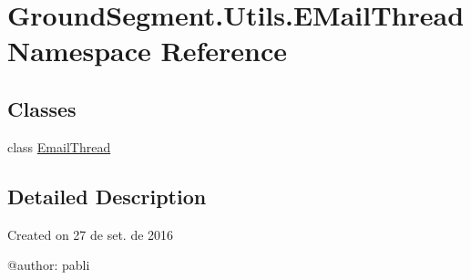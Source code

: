 \hypertarget{namespace_ground_segment_1_1_utils_1_1_e_mail_thread}{}\section{Ground\+Segment.\+Utils.\+E\+Mail\+Thread Namespace Reference}
\label{namespace_ground_segment_1_1_utils_1_1_e_mail_thread}
\subsection*{Classes}
\begin{DoxyCompactItemize}
\item 
class \hyperlink{class_ground_segment_1_1_utils_1_1_e_mail_thread_1_1_email_thread}{Email\+Thread}
\end{DoxyCompactItemize}


\subsection{Detailed Description}
\begin{DoxyVerb}Created on 27 de set. de 2016

@author: pabli
\end{DoxyVerb}
 